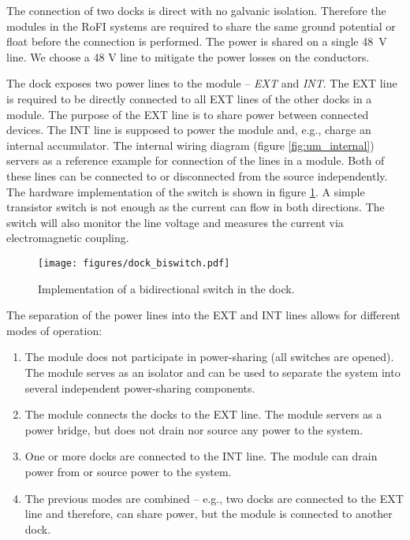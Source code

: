 The connection of two docks is direct with no galvanic isolation. Therefore the
modules in the RoFI systems are required to share the same ground potential or
float before the connection is performed. The power is shared on a single 48~V
line. We choose a 48 V line to mitigate the power losses on the conductors.

The dock exposes two power lines to the module -- \emph{EXT} and \emph{INT}. The
EXT line is required to be directly connected to all EXT lines of the other
docks in a module. The purpose of the EXT line is to share power between
connected devices. The INT line is supposed to power the module and, e.g.,
charge an internal accumulator. The internal wiring diagram (figure
\ref{fig:um_internal}) servers as a reference example for connection of the
lines in a module. Both of these lines can be connected to or disconnected from
the source independently. The hardware implementation of the switch is shown in
figure \ref{fig:dock_biswitch}. A simple transistor switch is not enough as the
current can flow in both directions. The switch will also monitor the line
voltage and measures the current via electromagnetic coupling.

\begin{figure}[t]
    \centering
    \texttt{[image: figures/dock\_biswitch.pdf]}
    \caption{Implementation of a bidirectional switch in the dock.}
    \label{fig:dock_biswitch}
\end{figure}

The separation of the power lines into the EXT and INT lines allows for
different modes of operation:
\begin{enumerate}
    \item The module does not participate in power-sharing (all switches are
    opened). The module serves as an isolator and can be used to separate
    the system into several independent power-sharing components.
    \item The module connects the docks to the EXT line. The module servers as a
    power bridge, but does not drain nor source any power to the system.
    \item One or more docks are connected to the INT line. The module can drain
    power from or source power to the system.
    \item The previous modes are combined -- e.g., two docks are connected to the
    EXT line and therefore, can share power, but the module is connected to
    another dock.
\end{enumerate}

